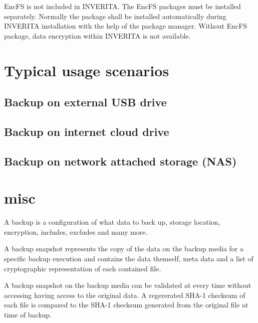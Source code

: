 \begin{warning}
EncFS is not included in INVERITA. The EncFS packages must be installed separately.
Normally the package shall be installed automatically during INVERITA installation
with the help of the package manager. Without EncFS package, data encryption within
INVERITA is not available.
\end{warning}

\section{Typical usage scenarios}

\subsection{Backup on external USB drive}

\subsection{Backup on internet cloud drive}

\subsection{Backup on network attached storage (NAS)}


\section{misc}

A backup is a configuration of what data to back up, storage location,
encryption, includes, excludes and many more.

A backup snapshot represents the copy of the data on the backup media
for a specific backup execution and contains the data themself, meta data
and a list of cryptographic representation of each contained file.

A backup snapshot on the backup media can be validated at every time
without accessing having access to the original data. A regererated SHA-1
checksum of each file is compared to the SHA-1 checksum generated from the
original file at time of backup.

